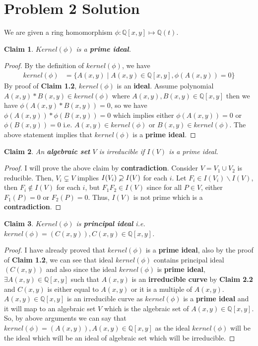 \documentclass{article}
\let\bold\textbf
\newtheorem{claim}{Claim}[section]
\begin{document}
\section{Problem 2 Solution}{
  We are given a ring homomorphism $\phi: \mathbb{Q}[x,y] \mapsto \mathbb{Q}(t)$.
  \begin{claim}
    $Kernel(\phi)$ is a \bold{prime ideal}.
  \end{claim}
  \begin{proof}
  By the definition of $kernel(\phi)$, we have
  \begin{align}
    kernel(\phi)&=\{A(x,y) \mid A(x,y) \in \mathbb{Q}[x,y], \phi(A(x,y))=0\} \label{eq:1}
  \end{align}
  By proof of \bold{Claim 1.2}, $kernel(\phi)$ is an \bold{ideal}. \newline
  Assume polynomial $A(x,y)*B(x,y)\in kernel(\phi)$ where $A(x,y),B(x,y)\in \mathbb{Q}[x,y]$ then we have $\phi(A(x,y)*B(x,y))=0$, so we have $\phi(A(x,y))*\phi(B(x,y))=0$ which implies either $\phi(A(x,y))=0$ or $\phi(B(x,y))=0$ i.e. $A(x,y) \in kernel(\phi)$ or $B(x,y) \in kernel(\phi)$. \newline
  The above statement implies that $kernel(\phi)$ is a \bold{prime ideal}.
  \end{proof}
  \begin{claim}
    An \bold{algebraic set} $V$ is irreducible if $I(V)$ is a prime ideal.
  \end{claim}
  \begin{proof}
    I will prove the above claim by \bold{contradiction}. Consider $V=V_1 \cup V_2$ is reducible. \newline
    Then, $V_i \varsubsetneq V$ implies $I(V_i) \varsupsetneq I(V)$ for each $i$. \newline
    Let $F_i \in I(V_i)\backslash I(V)$, then $F_i \notin I(V)$ for each $i$, but $F_1F_2 \in I(V)$ since for all $P \in V$, either $F_1(P)=0$ or $F_2(P)=0$. Thus, $I(V)$ is not prime which is a \bold{contradiction}.
  \end{proof}
  \begin{claim}
    $Kernel(\phi)$ is \bold{principal ideal} i.e. $kernel(\phi)=(C(x,y)),C(x,y)\in \mathbb{Q}[x,y]$.
  \end{claim}
  \begin{proof}
    I have already proved that $kernel(\phi)$ is a \bold{prime ideal}, also by the proof of \bold{Claim 1.2}, we can see that ideal $kernel(\phi)$ contains principal ideal $(C(x,y))$ and also since the ideal $kernel(\phi)$ is \bold{prime ideal}, $\exists A(x,y) \in \mathbb{Q}[x,y]$ such that $A(x,y)$ is an \bold{irreducible curve} by \bold{Claim 2.2} and $C(x,y)$ is either equal to $A(x,y)$ or it is a multiple of $A(x,y)$. \newline
    $A(x,y)\in \mathbb{Q}[x,y]$ is an irreducible curve as $kernel(\phi)$ is a \bold{prime ideal} and it will map to an algebraic set $V$ which is the algebraic set of $A(x,y) \in \mathbb{Q}[x,y]$. \newline
    So, by above arguments we can say that $kernel(\phi)=(A(x,y)),A(x,y)\in \mathbb{Q}[x,y]$ as the ideal $kernel(\phi)$ will be the ideal which will be an ideal of algebraic set which will be irreducible.
  \end{proof}
}
\newpage
\end{document}
